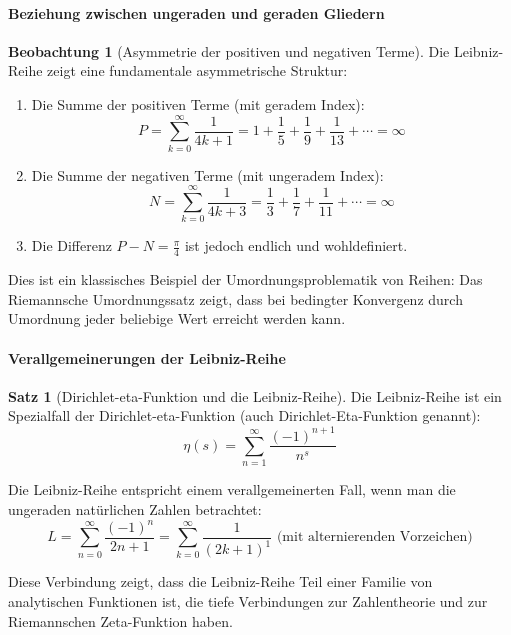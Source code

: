 \documentclass[a4paper,12pt,twoside]{report}
\theoremstyle{definition}
\newtheorem{satz}{Satz}
\newtheorem{beobachtung}{Beobachtung}
\begin{document}
\paragraph{Beziehung zwischen ungeraden und geraden Gliedern}

\begin{beobachtung}[Asymmetrie der positiven und negativen Terme]
Die Leibniz-Reihe zeigt eine fundamentale asymmetrische Struktur:
\begin{enumerate}
\item Die Summe der positiven Terme (mit geradem Index):
\begin{equation}
P = \sum_{k=0}^{\infty} \frac{1}{4k+1} = 1 + \frac{1}{5} + \frac{1}{9} + \frac{1}{13} + \cdots = \infty
\end{equation}

\item Die Summe der negativen Terme (mit ungeradem Index):
\begin{equation}
N = \sum_{k=0}^{\infty} \frac{1}{4k+3} = \frac{1}{3} + \frac{1}{7} + \frac{1}{11} + \cdots = \infty
\end{equation}

\item Die Differenz $P - N = \frac{\pi}{4}$ ist jedoch endlich und wohldefiniert.
\end{enumerate}

Dies ist ein klassisches Beispiel der Umordnungsproblematik von Reihen: Das Riemannsche Umordnungssatz zeigt, dass bei bedingter Konvergenz durch Umordnung jeder beliebige Wert erreicht werden kann.
\end{beobachtung}

\paragraph{Verallgemeinerungen der Leibniz-Reihe}

\begin{satz}[Dirichlet-eta-Funktion und die Leibniz-Reihe]
Die Leibniz-Reihe ist ein Spezialfall der Dirichlet-eta-Funktion (auch Dirichlet-Eta-Funktion genannt):
\begin{equation}
\eta(s) = \sum_{n=1}^{\infty} \frac{(-1)^{n+1}}{n^s}
\end{equation}

Die Leibniz-Reihe entspricht einem verallgemeinerten Fall, wenn man die ungeraden natürlichen Zahlen betrachtet:
\begin{equation}
L = \sum_{n=0}^{\infty} \frac{(-1)^n}{2n+1} = \sum_{k=0}^{\infty} \frac{1}{(2k+1)^1} \text{ (mit alternierenden Vorzeichen)}
\end{equation}

Diese Verbindung zeigt, dass die Leibniz-Reihe Teil einer Familie von analytischen Funktionen ist, die tiefe Verbindungen zur Zahlentheorie und zur Riemannschen Zeta-Funktion haben.
\end{satz}
\end{document}

